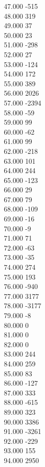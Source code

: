 { 47.000	-515 \\
 48.000	319 \\
 49.000	37 \\
 50.000	23 \\
 51.000	-298 \\
 52.000	27 \\
 53.000	-124 \\
 54.000	172 \\
 55.000	389 \\
 56.000	2026 \\
 57.000	-2394 \\
 58.000	-59 \\
 59.000	99 \\
 60.000	-62 \\
 61.000	99 \\
 62.000	-218 \\
 63.000	101 \\
 64.000	244 \\
 65.000	-123 \\
 66.000	29 \\
 67.000	79 \\
 68.000	-109 \\
 69.000	-16 \\
 70.000	-9 \\
 71.000	71 \\
 72.000	-63 \\
 73.000	-35 \\
 74.000	274 \\
 75.000	193 \\
 76.000	-940 \\
 77.000	3177 \\
 78.000	-3177 \\
 79.000	-8 \\
 80.000	0 \\
 81.000	0 \\
 82.000	0 \\
 83.000	244 \\
 84.000	259 \\
 85.000	83 \\
 86.000	-127 \\
 87.000	333 \\
 88.000	-615 \\
 89.000	323 \\
 90.000	3386 \\
 91.000	-3261 \\
 92.000	-229 \\
 93.000	155 \\
 94.000	2950 \\
}
